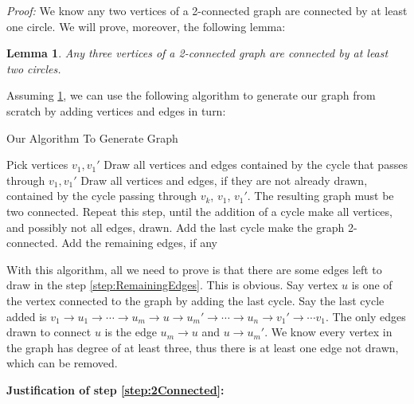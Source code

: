 \documentclass{article}
\newenvironment{solution}
    {\textit{Proof:}}
    {}
\newtheorem{lemma}[theorem]{Lemma}
\theoremstyle{definition}
\theoremstyle{definition}
\theoremstyle{remark}
\begin{document}
\begin{solution}
	We know any two vertices of a 2-connected graph are connected by at least one circle. 
	We will prove, moreover, the following lemma:

	\begin{lemma}\label{lemma:3VerticeInOneCycle}
		Any three vertices of a 2-connected graph are connected by at least two circles.
	\end{lemma}

	Assuming \ref{lemma:3VerticeInOneCycle}, we can use the following algorithm to generate our graph from scratch by adding vertices and edges in turn:
	\begin{algorithm}
		\caption{Our Algorithm To Generate Graph}
		\begin{algorithmic}[1]
			\State Pick vertices $v_1, v_1'$
			\State Draw all vertices and edges contained by the cycle that passes through $v_1, v_1'$ 
			\State Draw all vertices and edges, if they are not already drawn, contained by the cycle passing through $v_k$, $v_1$, $v_1'$.
			\State The resulting graph must be two connected.  \label{step:2Connected} 
			\State Repeat this step, until the addition of a cycle make all vertices, and possibly not all edges, drawn.
			\EndIf
			\State Add the last cycle make the graph 2-connected. 
			\State Add the remaining edges, if any \label{step:RemainingEdges}
		\end{algorithmic}
	\end{algorithm}
	
	With this algorithm, all we need to prove is that there are some edges left to draw in the step \ref{step:RemainingEdges}. 
	This is obvious. Say vertex $u$ is one of the vertex connected to the graph by adding the last cycle. 
	Say the last cycle added is $v_1 \rightarrow  u_1 \rightarrow \cdots \rightarrow u_m \rightarrow  u \rightarrow  u_m' \rightarrow \cdots \rightarrow  u_n \rightarrow  v_1' \rightarrow  \cdots v_1$. The only edges drawn to connect $u$ is the edge $u_m \rightarrow u$ and $u \rightarrow u_m'$.
	We know every vertex in the graph has degree of at least three, thus there is at least one edge not drawn, which can be removed.
	
	\textbf{Justification of step \ref{step:2Connected}:}


\end{solution}
\end{document}
